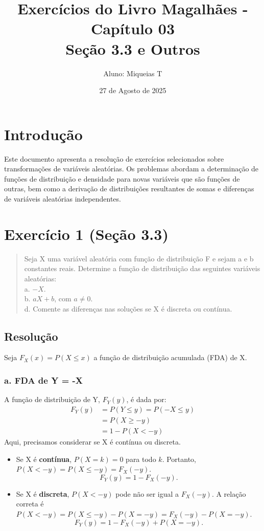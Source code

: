 \documentclass[12pt]{article}
\title{Exercícios do Livro Magalhães - Capítulo 03\\\large{Seção 3.3 e Outros}}
\author{Aluno: Miqueias T}
\date{27 de Agosto de 2025}
\begin{document}
\maketitle

\section*{Introdução}
Este documento apresenta a resolução de exercícios selecionados sobre transformações de variáveis aleatórias. Os problemas abordam a determinação de funções de distribuição e densidade para novas variáveis que são funções de outras, bem como a derivação de distribuições resultantes de somas e diferenças de variáveis aleatórias independentes.

\section{Exercício 1 (Seção 3.3)}

\begin{quote}
Seja X uma variável aleatória com função de distribuição F e sejam a e b constantes reais. Determine a função de distribuição das seguintes variáveis aleatórias: \\
a. $-X$. \\
b. $aX + b$, com $a \ne 0$. \\
d. Comente as diferenças nas soluções se X é discreta ou contínua.
\end{quote}

\subsection*{Resolução}

Seja $F_X(x) = P(X \le x)$ a função de distribuição acumulada (FDA) de X.

\subsubsection*{a. FDA de Y = -X}
A função de distribuição de Y, $F_Y(y)$, é dada por:
\begin{align*}
F_Y(y) &= P(Y \le y) = P(-X \le y) \\
&= P(X \ge -y) \\
&= 1 - P(X < -y)
\end{align*}
Aqui, precisamos considerar se X é contínua ou discreta.
\begin{itemize}
    \item Se X é \textbf{contínua}, $P(X = k) = 0$ para todo $k$. Portanto, $P(X < -y) = P(X \le -y) = F_X(-y)$.
    \[ F_Y(y) = 1 - F_X(-y). \]
    \item Se X é \textbf{discreta}, $P(X < -y)$ pode não ser igual a $F_X(-y)$. A relação correta é $P(X < -y) = P(X \le -y) - P(X = -y) = F_X(-y) - P(X = -y)$.
    \[ F_Y(y) = 1 - F_X(-y) + P(X = -y). \]
\end{itemize}
\end{document}
